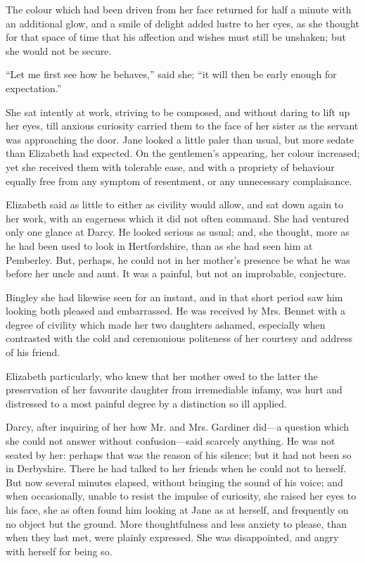 The colour which had been driven from her face returned for half a minute with an additional glow, and a smile of delight added lustre to her eyes, as she thought for that space of time that his affection and wishes must still be unshaken; but she would not be secure.

``Let me first see how he behaves,'' said she; ``it will then be early enough for expectation.''

She sat intently at work, striving to be composed, and without daring to lift up her eyes, till anxious curiosity carried them to the face of her sister as the servant was approaching the door. Jane looked a little paler than usual, but more sedate than Elizabeth had expected. On the gentlemen's appearing, her colour increased; yet she received them with tolerable ease, and with a propriety of behaviour equally free from any symptom of resentment, or any unnecessary complaisance.

Elizabeth said as little to either as civility would allow, and sat down again to her work, with an eagerness which it did not often command. She had ventured only one glance at Darcy. He looked serious as usual; and, she thought, more as he had been used to look in Hertfordshire, than as she had seen him at Pemberley. But, perhaps, he could not in her mother's presence be what he was before her uncle and aunt. It was a painful, but not an improbable, conjecture.

Bingley she had likewise seen for an instant, and in that short period saw him looking both pleased and embarrassed. He was received by Mrs. Bennet with a degree of civility which made her two daughters ashamed, especially when contrasted with the cold and ceremonious politeness of her courtesy and address of his friend.

Elizabeth particularly, who knew that her mother owed to the latter the preservation of her favourite daughter from irremediable infamy, was hurt and distressed to a most painful degree by a distinction so ill applied.

Darcy, after inquiring of her how Mr. and Mrs. Gardiner did---a question which she could not answer without confusion---said scarcely anything. He was not seated by her: perhaps that was the reason of his silence; but it had not been so in Derbyshire. There he had talked to her friends when he could not to herself. But now several minutes elapsed, without bringing the sound of his voice; and when occasionally, unable to resist the impulse of curiosity, she raised her eyes to his face, she as often found him looking at Jane as at herself, and frequently on no object but the ground. More thoughtfulness and less anxiety to please, than when they last met, were plainly expressed. She was disappointed, and angry with herself for being so.

